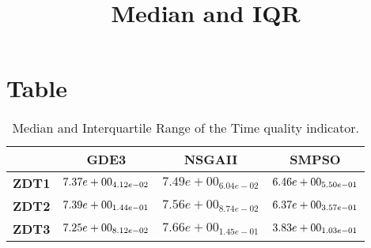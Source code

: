 \documentclass{article}
\title{Median and IQR}
\author{}
\begin{document}
\maketitle
\section{Table}
\begin{table}[!htp]
  \caption{Median and Interquartile Range of the Time quality indicator.}
  \label{table:Time}
  \centering
  \begin{scriptsize}
  \begin{tabular}{c|ccc}
      & \textbf{GDE3} & \textbf{NSGAII} & \textbf{SMPSO} \\\hline
      \textbf{ZDT1} & $\cellcolor{gray25} 7.37e+00_{4.12e-02} $ & $ 7.49e+00_{6.04e-02} $ & $ \cellcolor{gray95} 6.46e+00_{5.50e-01}$ \\
      \textbf{ZDT2} & $\cellcolor{gray25} 7.39e+00_{1.44e-01} $ & $ 7.56e+00_{8.74e-02} $ & $ \cellcolor{gray95} 6.37e+00_{3.57e-01}$ \\
      \textbf{ZDT3} & $\cellcolor{gray25} 7.25e+00_{8.12e-02} $ & $ 7.66e+00_{1.45e-01} $ & $ \cellcolor{gray95} 3.83e+00_{1.03e-01}$ \\
  \end{tabular}
  \end{scriptsize}
\end{table}
\end{document}
